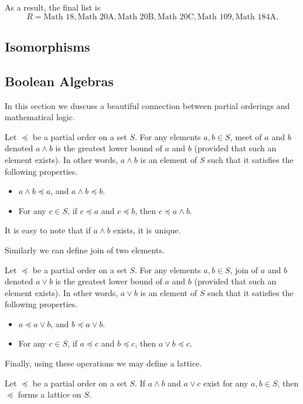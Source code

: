 As a result, the final list is
\[
  R = \text{Math 18}, \text{Math 20A}, \text{Math 20B}, \text{Math 20C},
  \text{Math 109}, \text{Math 184A}.
\]

\subsection{Isomorphisms}

\subsection{Boolean Algebras}
In this section we duscuss a beautiful connection between partial orderings and
mathematical logic.

\begin{definition}
  Let $\preceq$ be a partial order on a set $S$.
  For any elements $a, b \in S$, meet of $a$ and $b$ denoted $a \land b$
  is the greatest lower bound of $a$ and $b$ (provided that such an element
  exists). In other words, $a \land b$ is an element of $S$ such that it
  satisfies the following properties.
  \begin{itemize}
    \item $a \land b \preceq a$, and $a \land b \preceq b$.
    \item For any $c \in S$, if $c \preceq a$ and $c \preceq b$, then
      $c \preceq a \land b$.
  \end{itemize}
\end{definition}
It is easy to note that if $a \land b$ exists, it is unique.

Similarly we can define join of two elements.
\begin{definition}
  Let $\preceq$ be a partial order on a set $S$.
  For any elements $a, b \in S$, join of $a$ and $b$ denoted $a \lor b$
  is the greatest lower bound of $a$ and $b$ (provided that such an element
  exists). In other words, $a \lor b$ is an element of $S$ such that it
  satisfies the following properties.
  \begin{itemize}
    \item $a \preceq a \lor b$, and $b \preceq a \lor b$.
    \item For any $c \in S$, if $a \preceq c$ and $b \preceq c$, then
      $a \lor b \preceq c$.
  \end{itemize}
\end{definition}

Finally, using these operations we may define a lattice.
\begin{definition}
  Let $\preceq$ be a partial order on a set $S$.
  If $a \land b$ and $a \lor c$ exist for any $a, b \in S$, then $\preceq$ forms
  a lattice on $S$.
\end{definition}

